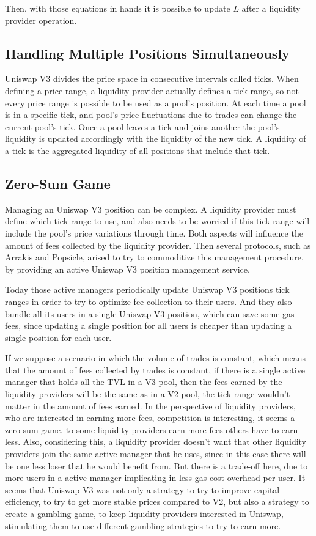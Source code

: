 \documentclass{article}
\begin{document}
Then, with those equations in hands it is possible to update $L$ after a liquidity provider operation.

\subsection{Handling Multiple Positions Simultaneously}

Uniswap V3 divides the price space in consecutive intervals called ticks.
When defining a price range, a liquidity provider actually defines a tick range, so not every price range is possible to be used as a pool's position.
At each time a pool is in a specific tick, and pool's price fluctuations due to trades can change the current pool's tick.
Once a pool leaves a tick and joins another the pool's liquidity is updated accordingly with the liquidity of the new tick.
A liquidity of a tick is the aggregated liquidity of all positions that include that tick.

\subsection{Zero-Sum Game}

Managing an Uniswap V3 position can be complex.
A liquidity provider must define which tick range to use, and also needs to be worried if this tick range will include the pool's price variations through time.
Both aspects will influence the amount of fees collected by the liquidity provider.
Then several protocols, such as Arrakis and Popsicle, arised to try to commoditize this management procedure, by providing an active Uniswap V3 position management service.

Today those active managers periodically update Uniswap V3 positions tick ranges in order to try to optimize fee collection to their users.
And they also bundle all its users in a single Uniswap V3 position, which can save some gas fees, since updating a single position for all users is cheaper than updating a single position for each user.

If we suppose a scenario in which the volume of trades is constant, which means that the amount of fees collected by trades is constant, if there is a single active manager that holds all the TVL in a V3 pool, then the fees earned by the liquidity providers will be the same as in a V2 pool, the tick range wouldn't matter in the amount of fees earned.
In the perspective of liquidity providers, who are interested in earning more fees, competition is interesting, it seems a zero-sum game, to some liquidity providers earn more fees others have to earn less.
Also, considering this, a liquidity provider doesn't want that other liquidity providers join the same active manager that he uses, since in this case there will be one less loser that he would benefit from.
But there is a trade-off here, due to more users in a active manager implicating in less gas cost overhead per user.
It seems that Uniswap V3 was not only a strategy to try to improve capital efficiency, to try to get more stable prices compared to V2, but also a strategy to create a gambling game, to keep liquidity providers interested in Uniswap, stimulating them to use different gambling strategies to try to earn more.
\end{document}

